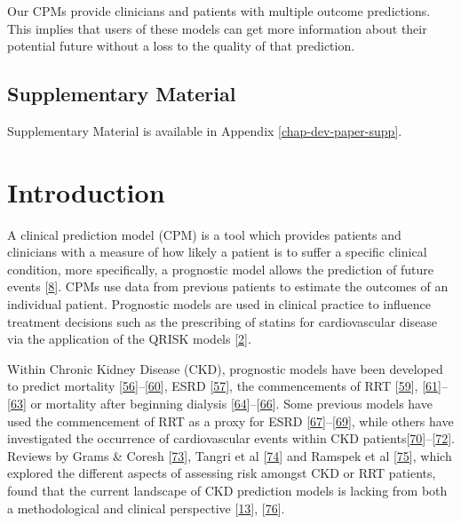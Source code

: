 \documentclass[12pt,PhD,twoside,openright]{muthesis}
\begin{document}
Our CPMs provide clinicians and patients with multiple outcome predictions. This implies that users of these models can get more information about their potential future without a loss to the quality of that prediction.

\hypertarget{supplementary-material-2}{%
\subsection*{Supplementary Material}\label{supplementary-material-2}}

Supplementary Material is available in Appendix \ref{chap-dev-paper-supp}.

\hypertarget{introduction-7}{%
\section{Introduction}\label{introduction-7}}

A clinical prediction model (CPM) is a tool which provides patients and clinicians with a measure of how likely a patient is to suffer a specific clinical condition, more specifically, a prognostic model allows the prediction of future events {[}\protect\hyperlink{ref-steyerberg_prognosis_2013}{8}{]}. CPMs use data from previous patients to estimate the outcomes of an individual patient. Prognostic models are used in clinical practice to influence treatment decisions such as the prescribing of statins for cardiovascular disease via the application of the QRISK models {[}\protect\hyperlink{ref-hippisley-cox_development_2017}{2}{]}.

Within Chronic Kidney Disease (CKD), prognostic models have been developed to predict mortality {[}\protect\hyperlink{ref-johnson_predicting_2007}{56}{]}--{[}\protect\hyperlink{ref-wick_clinical_2017}{60}{]}, ESRD {[}\protect\hyperlink{ref-landray_prediction_2010}{57}{]}, the commencements of RRT {[}\protect\hyperlink{ref-marks_looking_2015}{59}{]}, {[}\protect\hyperlink{ref-johnson_predicting_2008}{61}{]}--{[}\protect\hyperlink{ref-kulkarni_transition_2017}{63}{]} or mortality after beginning dialysis {[}\protect\hyperlink{ref-floege_development_2015}{64}{]}--{[}\protect\hyperlink{ref-cao_predicting_2015}{66}{]}. Some previous models have used the commencement of RRT as a proxy for ESRD {[}\protect\hyperlink{ref-tangri_predictive_2011}{67}{]}--{[}\protect\hyperlink{ref-tangri_dynamic_2017}{69}{]}, while others have investigated the occurrence of cardiovascular events within CKD patients{[}\protect\hyperlink{ref-shlipak_cardiovascular_2005}{70}{]}--{[}\protect\hyperlink{ref-mcmurray_predictors_2011}{72}{]}. Reviews by Grams \& Coresh {[}\protect\hyperlink{ref-grams_assessing_2013}{73}{]}, Tangri et al {[}\protect\hyperlink{ref-tangri_risk_2013}{74}{]} and Ramspek et al {[}\protect\hyperlink{ref-ramspek_prediction_2017}{75}{]}, which explored the different aspects of assessing risk amongst CKD or RRT patients, found that the current landscape of CKD prediction models is lacking from both a methodological and clinical perspective {[}\protect\hyperlink{ref-collins_transparent_2015}{13}{]}, {[}\protect\hyperlink{ref-bouwmeester_reporting_2012-1}{76}{]}.
\end{document}
